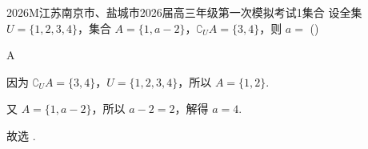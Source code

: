 
\begin{problem}{2026}{M}{江苏南京市、盐城市2026届高三年级第一次模拟考试}{1}{集合}
设全集 $U=\{1,2,3,4\}$，集合 $A=\{1,a-2\}$，$\complement_U A=\{3,4\}$，则 $a=$
(\hspace{1cm})
\begin{choices}
\end{choices}
\end{problem}

\begin{answer}
A
\end{answer}

\begin{solutions}
因为 $\complement_U A=\{3,4\}$，$U=\{1,2,3,4\}$，所以 $A=\{1,2\}$.

又 $A=\{1,a-2\}$，所以 $a-2=2$，解得 $a=4$.

故选 .
\end{solutions}

